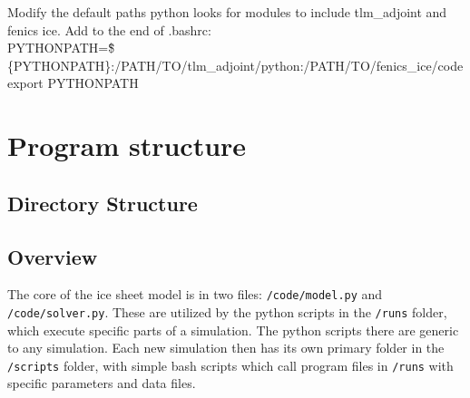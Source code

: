 \documentclass[11pt, reqno, nocenter]{article}
\begin{document}
Modify the default paths python looks for modules to include tlm\_adjoint and fenics ice. Add to the end of .bashrc: \\
PYTHONPATH=\"\$\{PYTHONPATH\}:/PATH/TO/tlm\_adjoint/python:/PATH/TO/fenics\_ice/code\" \\
export PYTHONPATH

\section{Program structure}

\subsection{Directory Structure}


\subsection{Overview}

The core of the ice sheet model is in two files: {\tt /code/model.py} and {\tt /code/solver.py}. These are utilized by the python scripts in the {\tt /runs} folder, which execute specific parts of a simulation. The python scripts there are generic to any simulation. Each new simulation then has its own primary folder in the {\tt /scripts} folder, with simple bash scripts which call program files in {\tt /runs} with specific parameters and data files.
\end{document}
